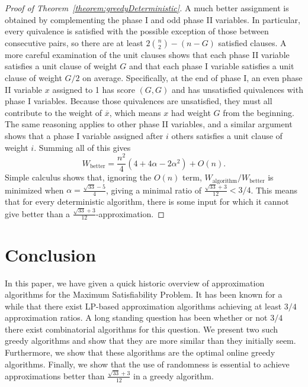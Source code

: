 \documentclass[11pt,letter]{article}
\numberwithin{theorem}{section}
\newcommand{\ol}{\overline}
\begin{document}
\begin{proof}[Proof of Theorem~\ref{theorem:greedyDeterministic}]
  A much better assignment is obtained by complementing
  the phase I and odd phase II variables.
  In particular, every quivalence is satisfied
  with the possible exception of those between consecutive pairs,
  so there are at least $2\binom{n}{2} - (n-G)$ satisfied clauses.
  A more careful examination of the unit clauses
  shows that each phase II variable satisfies a unit clause of weight $G$
  and that each phase I variable satisfies
  a unit clause of weight $G/2$ on average.
  Specifically, at the end of phase I,
  an even phase II variable $x$ assigned to 1 has score $(G,G)$
  and has unsatisfied quivalences with phase I variables.
  Because those quivalences are unsatisfied,
  they must all contribute to the weight of $\ol{x}$,
  which means $x$ had weight $G$ from the beginning.
  The same reasoning applies to other phase II variables,
  and a similar argument shows that a phase I variable assigned
  after $i$ others satisfies a unit clause of weight $i$.
  Summing all of this gives
  \[
    W_\textrm{better} = \frac{n^2}{4}(4 + 4\alpha - 2\alpha^2) + O(n).
  \]
  Simple calculus shows that, ignoring the $O(n)$ term,
  $W_\textrm{algorithm}/W_\textrm{better}$
  is minimized when $\alpha = \frac{\sqrt{33} - 5}{4}$,
  giving a minimal ratio of $\frac{\sqrt{33} + 3}{12} < 3/4$.
  This means that for every deterministic algorithm,
  there is some input for which it cannot give better than a
  $\frac{\sqrt{33} + 3}{12}$-approximation.
\end{proof}

\section{Conclusion}

In this paper, we have given a quick historic overview of approximation algorithms for the Maximum Satisfiability Problem. 
It has been known for a while that there exist LP-based approximation algorithms achieving at least $3/4$ approximation ratios. 
A long standing question has been whether or not $3/4$ there exist combinatorial algorithms for this question. We present two such
greedy algorithms and show that they are more similar than they initially seem. 
Furthermore, we show that these algorithms are the optimal online greedy algorithms. Finally, we show that the use of randomness is 
essential to achieve approximations better than $\frac{\sqrt{33}+3}{12}$ in a greedy algorithm.  







\end{document}

